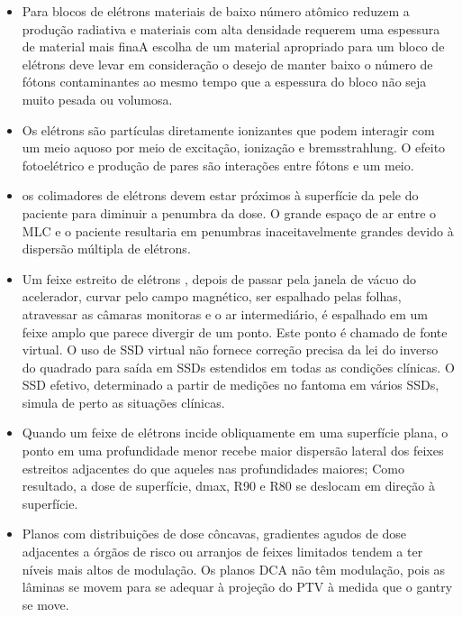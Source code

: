 \documentclass[11pt,a4paper]{article}
\newcounter{exemplo}
\begin{document}
\begin{exemplo}[Radioterapia]
\begin{itemize}
        \item Para blocos de elétrons materiais de baixo número atômico reduzem a produção radiativa e materiais com alta densidade requerem uma espessura de material mais finaA escolha de um material apropriado para um bloco de elétrons deve levar em consideração o desejo de manter baixo o número de fótons contaminantes ao mesmo tempo que a espessura do bloco não seja muito pesada ou volumosa. 
        
        \item Os elétrons são partículas diretamente ionizantes que podem interagir com um meio aquoso por meio de excitação, ionização e bremsstrahlung. O efeito fotoelétrico e produção de pares são interações entre fótons e um meio.
        
        \item os colimadores de elétrons devem estar próximos à superfície da pele do paciente para diminuir a penumbra da dose. O grande espaço de ar entre o MLC e o paciente resultaria em penumbras inaceitavelmente grandes devido à dispersão múltipla de elétrons.
        
        \item Um feixe estreito de elétrons , depois de passar pela janela de vácuo do acelerador, curvar pelo campo magnético, ser espalhado pelas folhas, atravessar as câmaras monitoras e o ar intermediário, é espalhado em um feixe amplo que parece divergir de um ponto. Este ponto é chamado de fonte virtual. O uso de SSD virtual não fornece correção precisa da lei do inverso do quadrado para saída em SSDs estendidos em todas as condições clínicas. O SSD efetivo, determinado a partir de medições no fantoma em vários SSDs, simula de perto as situações clínicas.
        
        \item Quando um feixe de elétrons incide obliquamente em uma superfície plana, o ponto em uma profundidade menor recebe maior dispersão lateral dos feixes estreitos adjacentes do que aqueles nas profundidades maiores; Como resultado, a dose de superfície, dmax, R90 e R80 se deslocam em direção à superfície.
    
       \item Planos com distribuições de dose côncavas, gradientes agudos de dose adjacentes a órgãos de risco ou arranjos de feixes limitados tendem a ter níveis mais altos de modulação. Os planos DCA não têm modulação, pois as lâminas se movem para se adequar à projeção do PTV à medida que o gantry se move.
       

\end{itemize}
\end{exemplo}
\end{document}
